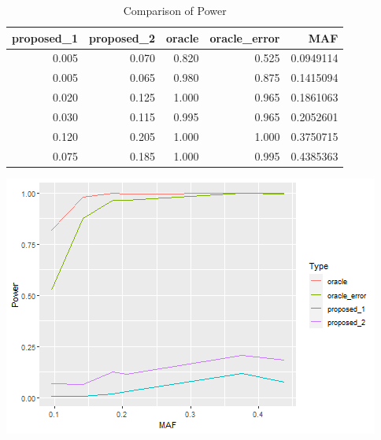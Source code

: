 \documentclass[
]{article}
\newenvironment{Shaded}{\begin{snugshade}}{\end{snugshade}}
\newcommand{\CommentTok}[1]{\textcolor[rgb]{0.56,0.35,0.01}{\textit{#1}}}
\newcommand{\DataTypeTok}[1]{\textcolor[rgb]{0.13,0.29,0.53}{#1}}
\newcommand{\DecValTok}[1]{\textcolor[rgb]{0.00,0.00,0.81}{#1}}
\newcommand{\KeywordTok}[1]{\textcolor[rgb]{0.13,0.29,0.53}{\textbf{#1}}}
\newcommand{\NormalTok}[1]{#1}
\newcommand{\OperatorTok}[1]{\textcolor[rgb]{0.81,0.36,0.00}{\textbf{#1}}}
\newcommand{\StringTok}[1]{\textcolor[rgb]{0.31,0.60,0.02}{#1}}
\begin{document}
\begin{table}

\caption{\label{tab:unnamed-chunk-8}Comparison of Power}
\centering
\begin{tabular}[t]{r|r|r|r|r}
\hline
proposed\_1 & proposed\_2 & oracle & oracle\_error & MAF\\
\hline
0.005 & 0.070 & 0.820 & 0.525 & 0.0949114\\
\hline
0.005 & 0.065 & 0.980 & 0.875 & 0.1415094\\
\hline
0.020 & 0.125 & 1.000 & 0.965 & 0.1861063\\
\hline
0.030 & 0.115 & 0.995 & 0.965 & 0.2052601\\
\hline
0.120 & 0.205 & 1.000 & 1.000 & 0.3750715\\
\hline
0.075 & 0.185 & 1.000 & 0.995 & 0.4385363\\
\hline
\end{tabular}
\end{table}

\begin{Shaded}
\end{Shaded}

\includegraphics{stats-gene-research-progress-v8_files/figure-latex/unnamed-chunk-8-1.png}
\end{document}

